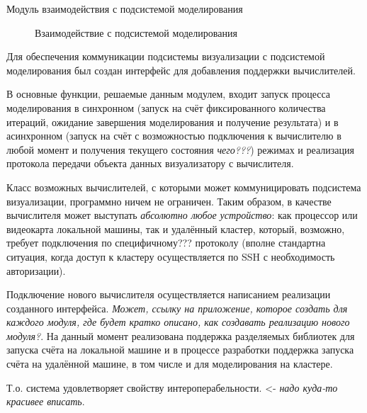 \documentclass[a4paper,12pt]{extarticle}
\begin{document}
\begin{subsection}{Модуль взаимодействия с подсистемой моделирования}
    \label{sec:architecture-calc}
    \begin{figure}[h]
        \caption{Взаимодействие с подсистемой моделирования}
        \label{ris:architecture-calc}
    \end{figure}
    
    Для обеспечения коммуникации подсистемы визуализации с подсистемой моделирования был создан интерфейс для добавления поддержки вычислителей.

    В основные функции, решаемые данным модулем, входит запуск процесса моделирования в синхронном (запуск на счёт фиксированного количества итераций, ожидание завершения моделирования и получение результата) и в асинхронном (запуск на счёт с возможностью подключения к вычислителю в любой момент и получения текущего состояния \textit{чего???}) режимах и реализация протокола передачи объекта данных визуализатору с вычислителя.

    Класс возможных вычислителей, с которыми может коммуницировать подсистема визуализации, программно ничем не ограничен. Таким образом, в качестве вычислителя может выступать \textit{абсолютно любое устройство}: как процессор или видеокарта локальной машины, так и удалённый кластер, который, возможно, требует подключения по специфичному??? протоколу (вполне стандартна ситуация, когда доступ к кластеру осуществляется по SSH с необходимость авторизации).

    Подключение нового вычислителя осуществляется написанием реализации созданного интерфейса.
    \textit{Может, ссылку на приложение, которое создать для каждого модуля, где будет кратко описано, как создавать реализацию нового модуля?}. На данный момент реализована поддержка разделяемых библиотек для запуска счёта на локальной машине и в процессе разработки поддержка запуска счёта на удалённой машине, в том числе и для моделирования на кластере.

    Т.о. система удовлетворяет свойству интероперабельности. <- \textit{надо куда-то красивее вписать}.
\end{subsection}
\end{document}
